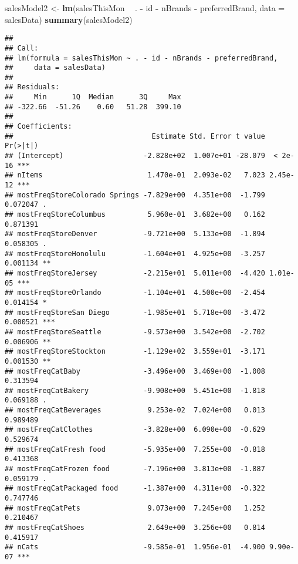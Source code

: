 \documentclass[
]{article}
\newenvironment{Shaded}{\begin{snugshade}}{\end{snugshade}}
\newcommand{\DataTypeTok}[1]{\textcolor[rgb]{0.13,0.29,0.53}{#1}}
\newcommand{\KeywordTok}[1]{\textcolor[rgb]{0.13,0.29,0.53}{\textbf{#1}}}
\newcommand{\NormalTok}[1]{#1}
\newcommand{\OperatorTok}[1]{\textcolor[rgb]{0.81,0.36,0.00}{\textbf{#1}}}
\newcommand{\StringTok}[1]{\textcolor[rgb]{0.31,0.60,0.02}{#1}}
\begin{document}
\begin{Shaded}
\begin{Highlighting}[]
\NormalTok{salesModel2 <-}\StringTok{ }\KeywordTok{lm}\NormalTok{(salesThisMon }\OperatorTok{~}\StringTok{ }\NormalTok{. }\OperatorTok{-}\StringTok{ }\NormalTok{id }\OperatorTok{-}\StringTok{ }\NormalTok{nBrands }\OperatorTok{-}\StringTok{ }\NormalTok{preferredBrand, }
                 \DataTypeTok{data =}\NormalTok{ salesData)}
\KeywordTok{summary}\NormalTok{(salesModel2)}
\end{Highlighting}
\end{Shaded}

\begin{verbatim}
## 
## Call:
## lm(formula = salesThisMon ~ . - id - nBrands - preferredBrand, 
##     data = salesData)
## 
## Residuals:
##     Min      1Q  Median      3Q     Max 
## -322.66  -51.26    0.60   51.28  399.10 
## 
## Coefficients:
##                                 Estimate Std. Error t value Pr(>|t|)    
## (Intercept)                   -2.828e+02  1.007e+01 -28.079  < 2e-16 ***
## nItems                         1.470e-01  2.093e-02   7.023 2.45e-12 ***
## mostFreqStoreColorado Springs -7.829e+00  4.351e+00  -1.799 0.072047 .  
## mostFreqStoreColumbus          5.960e-01  3.682e+00   0.162 0.871391    
## mostFreqStoreDenver           -9.721e+00  5.133e+00  -1.894 0.058305 .  
## mostFreqStoreHonolulu         -1.604e+01  4.925e+00  -3.257 0.001134 ** 
## mostFreqStoreJersey           -2.215e+01  5.011e+00  -4.420 1.01e-05 ***
## mostFreqStoreOrlando          -1.104e+01  4.500e+00  -2.454 0.014154 *  
## mostFreqStoreSan Diego        -1.985e+01  5.718e+00  -3.472 0.000521 ***
## mostFreqStoreSeattle          -9.573e+00  3.542e+00  -2.702 0.006906 ** 
## mostFreqStoreStockton         -1.129e+02  3.559e+01  -3.171 0.001530 ** 
## mostFreqCatBaby               -3.496e+00  3.469e+00  -1.008 0.313594    
## mostFreqCatBakery             -9.908e+00  5.451e+00  -1.818 0.069188 .  
## mostFreqCatBeverages           9.253e-02  7.024e+00   0.013 0.989489    
## mostFreqCatClothes            -3.828e+00  6.090e+00  -0.629 0.529674    
## mostFreqCatFresh food         -5.935e+00  7.255e+00  -0.818 0.413368    
## mostFreqCatFrozen food        -7.196e+00  3.813e+00  -1.887 0.059179 .  
## mostFreqCatPackaged food      -1.387e+00  4.311e+00  -0.322 0.747746    
## mostFreqCatPets                9.073e+00  7.245e+00   1.252 0.210467    
## mostFreqCatShoes               2.649e+00  3.256e+00   0.814 0.415917    
## nCats                         -9.585e-01  1.956e-01  -4.900 9.90e-07 ***

\end{verbatim}
\end{document}
